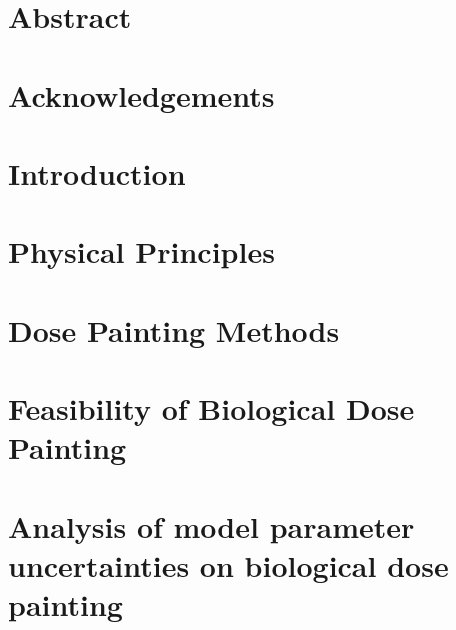 



\cleardoublepage


\cleardoublepage

\chapter*{Abstract}{}
\thispagestyle{empty}
\cleardoublepage

\chapter*{Acknowledgements}{}
\thispagestyle{empty}
\cleardoublepage

\newpage
\setcounter{page}{1}
\pagestyle{headings}

\renewcommand{\contentsname}{Table of Contents}
\tableofcontents
\cleardoublepage

\newpage
\setcounter{page}{1}

\chapter{Introduction}\label{chapter:1}


\chapter{Physical Principles}\label{chapter:2}


\chapter{Dose Painting Methods}\label{chapter:3}


\chapter{Feasibility of Biological Dose Painting}\label{chapter:4}


\chapter[Analysis of model parameter uncertainties]{Analysis of model parameter uncertainties on biological dose painting}\label{chapter:5}


